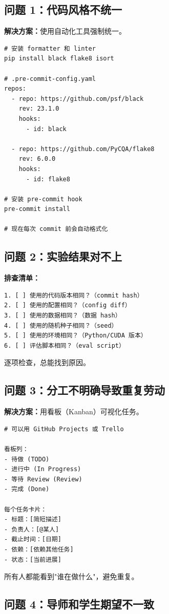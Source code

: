 \subsection{问题 1：代码风格不统一}

\textbf{解决方案：}使用自动化工具强制统一。

\begin{verbatim}
# 安装 formatter 和 linter
pip install black flake8 isort

# .pre-commit-config.yaml
repos:
  - repo: https://github.com/psf/black
    rev: 23.1.0
    hooks:
      - id: black

  - repo: https://github.com/PyCQA/flake8
    rev: 6.0.0
    hooks:
      - id: flake8

# 安装 pre-commit hook
pre-commit install

# 现在每次 commit 前会自动格式化
\end{verbatim}

\subsection{问题 2：实验结果对不上}

\textbf{排查清单：}
\begin{verbatim}
1. [ ] 使用的代码版本相同？（commit hash）
2. [ ] 使用的配置相同？（config diff）
3. [ ] 使用的数据相同？（数据 hash）
4. [ ] 使用的随机种子相同？（seed）
5. [ ] 使用的环境相同？（Python/CUDA 版本）
6. [ ] 评估脚本相同？（eval script）
\end{verbatim}

逐项检查，总能找到原因。

\subsection{问题 3：分工不明确导致重复劳动}

\textbf{解决方案：}用看板（Kanban）可视化任务。

\begin{verbatim}
# 可以用 GitHub Projects 或 Trello

看板列：
- 待做 (TODO)
- 进行中 (In Progress)
- 等待 Review (Review)
- 完成 (Done)

每个任务卡片：
- 标题：[简短描述]
- 负责人：[@某人]
- 截止时间：[日期]
- 依赖：[依赖其他任务]
- 状态：[当前进展]
\end{verbatim}

所有人都能看到"谁在做什么"，避免重复。

\subsection{问题 4：导师和学生期望不一致}

